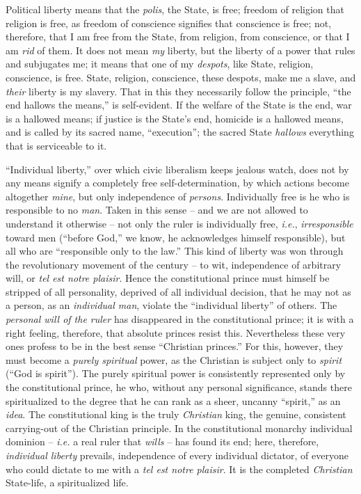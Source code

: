 Political liberty means that the \textit{polis}, the State, is free; freedom 
of religion that religion is free, as freedom of conscience signifies that 
conscience is free; not, therefore, that I am free from the State, from 
religion, from conscience, or that I am \textit{rid} of them. It does not mean 
\textit{my} liberty, but the liberty of a power that rules and subjugates me; 
it means that one of my \textit{despots}, like State, religion, conscience, is 
free. State, religion, conscience, these despots, make me a slave, and 
\textit{their} liberty is my slavery. That in this they necessarily follow the 
principle, ``the end hallows the means,'' is self-evident. If the welfare of 
the State is the end, war is a hallowed means; if justice is the State's end, 
homicide is a hallowed means, and is called by its sacred name, 
``execution''; the sacred State \textit{hallows} everything that is 
serviceable to it.

``Individual liberty,'' over which civic liberalism keeps jealous watch, 
does not by any means signify a completely free self-determination, by which 
actions become altogether \textit{mine}, but only independence of 
\textit{persons}. Individually free is he who is responsible to no 
\textit{man}. Taken in this sense -- and we are not allowed to understand it 
otherwise -- not only the ruler is individually free, \textit{i.e.}, 
\textit{irresponsible} toward men (``before God,'' we know, he acknowledges 
himself responsible), but all who are ``responsible only to the law.'' This 
kind of liberty was won through the revolutionary movement of the century -- 
to wit, independence of arbitrary will, or \textit{tel est notre plaisir}. 
Hence the constitutional prince must himself be stripped of all personality, 
deprived of all individual decision, that he may not as a person, as an 
\textit{individual man}, violate the ``individual liberty'' of others. The 
\textit{personal will of the ruler} has disappeared in the constitutional 
prince; it is with a right feeling, therefore, that absolute princes resist 
this. Nevertheless these very ones profess to be in the best sense 
``Christian princes.'' For this, however, they must become a \textit{purely 
spiritual} power, as the Christian is subject only to \textit{spirit} (``God 
is spirit''). The purely spiritual power is consistently represented only by 
the constitutional prince, he who, without any personal significance, stands 
there spiritualized to the degree that he can rank as a sheer, uncanny 
``spirit,'' as an \textit{idea}. The constitutional king is the truly 
\textit{Christian} king, the genuine, consistent carrying-out of the Christian 
principle. In the constitutional monarchy individual dominion -- \textit{i.e.} 
a real ruler that \textit{wills} -- has found its end; here, therefore, 
\textit{individual liberty} prevails, independence of every individual 
dictator, of everyone who could dictate to me with a \textit{tel est notre 
plaisir}. It is the completed \textit{Christian} State-life, a spiritualized 
life.

